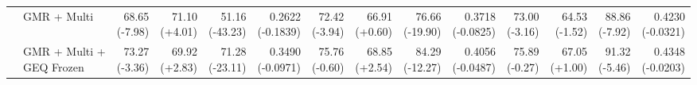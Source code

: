 \documentclass{article}
\begin{document}
{\begin{tabular}{llrrrrrrrrrrrr}
 & GMR + Multi & \shortstack{68.65 \\ {\scriptsize\textcolor{Loss}{(-7.98)}}} & \shortstack{71.10 \\ {\scriptsize\textcolor{Gain}{(+4.01)}}} & \shortstack{51.16 \\ {\scriptsize\textcolor{Loss}{(-43.23)}}} & \shortstack{0.2622 \\ {\scriptsize\textcolor{Loss}{(-0.1839)}}} & \shortstack{72.42 \\ {\scriptsize\textcolor{Loss}{(-3.94)}}} & \shortstack{66.91 \\ {\scriptsize\textcolor{Gain}{(+0.60)}}} & \shortstack{76.66 \\ {\scriptsize\textcolor{Loss}{(-19.90)}}} & \shortstack{0.3718 \\ {\scriptsize\textcolor{Loss}{(-0.0825)}}} & \shortstack{73.00 \\ {\scriptsize\textcolor{Loss}{(-3.16)}}} & \shortstack{64.53 \\ {\scriptsize\textcolor{Loss}{(-1.52)}}} & \shortstack{88.86 \\ {\scriptsize\textcolor{Loss}{(-7.92)}}} & \shortstack{0.4230 \\ {\scriptsize\textcolor{Loss}{(-0.0321)}}} \\
 & GMR + Multi + GEQ Frozen & \shortstack{73.27 \\ {\scriptsize\textcolor{Loss}{(-3.36)}}} & \shortstack{69.92 \\ {\scriptsize\textcolor{Gain}{(+2.83)}}} & \shortstack{71.28 \\ {\scriptsize\textcolor{Loss}{(-23.11)}}} & \shortstack{0.3490 \\ {\scriptsize\textcolor{Loss}{(-0.0971)}}} & \shortstack{75.76 \\ {\scriptsize\textcolor{Loss}{(-0.60)}}} & \shortstack{68.85 \\ {\scriptsize\textcolor{Gain}{(+2.54)}}} & \shortstack{84.29 \\ {\scriptsize\textcolor{Loss}{(-12.27)}}} & \shortstack{0.4056 \\ {\scriptsize\textcolor{Loss}{(-0.0487)}}} & \shortstack{75.89 \\ {\scriptsize\textcolor{Loss}{(-0.27)}}} & \shortstack{67.05 \\ {\scriptsize\textcolor{Gain}{(+1.00)}}} & \shortstack{91.32 \\ {\scriptsize\textcolor{Loss}{(-5.46)}}} & \shortstack{0.4348 \\ {\scriptsize\textcolor{Loss}{(-0.0203)}}} \\

\end{tabular}}
\end{document}
